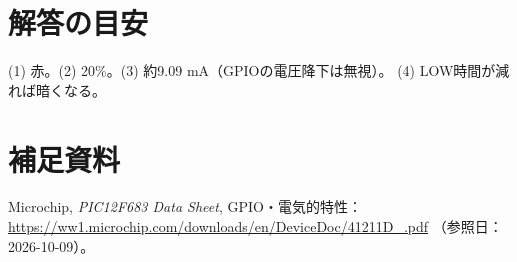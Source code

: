 \documentclass[lualatex,a4paper,10pt]{jlreq}
\begin{document}
\section*{解答の目安}\label{sec:auto9}
(1) 赤。(2) 20\%。(3) 約9.09 mA（GPIOの電圧降下は無視）。
(4) LOW時間が減れば暗くなる。
\section*{補足資料}\label{sec:auto10}
Microchip, \textit{PIC12F683 Data Sheet}, GPIO・電気的特性：
\url{https://ww1.microchip.com/downloads/en/DeviceDoc/41211D_.pdf}
（参照日：2026-10-09）。
\prelabclosing
\end{document}
